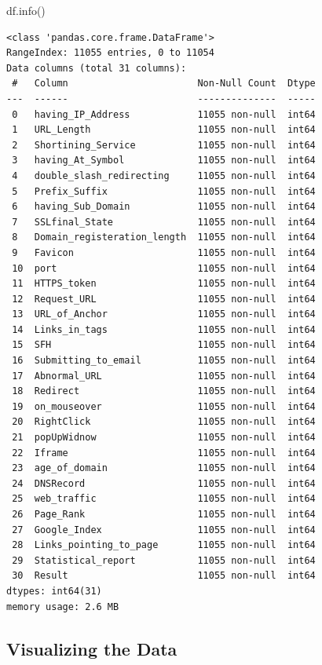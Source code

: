 \documentclass[
  letterpaper,
  DIV=11,
  numbers=noendperiod]{scrartcl}
\newenvironment{Shaded}{\begin{snugshade}}{\end{snugshade}}
\newcommand{\NormalTok}[1]{\textcolor[rgb]{0.00,0.23,0.31}{#1}}
\begin{document}
\begin{Shaded}
\begin{Highlighting}[]
\NormalTok{df.info()}
\end{Highlighting}
\end{Shaded}

\begin{verbatim}
<class 'pandas.core.frame.DataFrame'>
RangeIndex: 11055 entries, 0 to 11054
Data columns (total 31 columns):
 #   Column                       Non-Null Count  Dtype
---  ------                       --------------  -----
 0   having_IP_Address            11055 non-null  int64
 1   URL_Length                   11055 non-null  int64
 2   Shortining_Service           11055 non-null  int64
 3   having_At_Symbol             11055 non-null  int64
 4   double_slash_redirecting     11055 non-null  int64
 5   Prefix_Suffix                11055 non-null  int64
 6   having_Sub_Domain            11055 non-null  int64
 7   SSLfinal_State               11055 non-null  int64
 8   Domain_registeration_length  11055 non-null  int64
 9   Favicon                      11055 non-null  int64
 10  port                         11055 non-null  int64
 11  HTTPS_token                  11055 non-null  int64
 12  Request_URL                  11055 non-null  int64
 13  URL_of_Anchor                11055 non-null  int64
 14  Links_in_tags                11055 non-null  int64
 15  SFH                          11055 non-null  int64
 16  Submitting_to_email          11055 non-null  int64
 17  Abnormal_URL                 11055 non-null  int64
 18  Redirect                     11055 non-null  int64
 19  on_mouseover                 11055 non-null  int64
 20  RightClick                   11055 non-null  int64
 21  popUpWidnow                  11055 non-null  int64
 22  Iframe                       11055 non-null  int64
 23  age_of_domain                11055 non-null  int64
 24  DNSRecord                    11055 non-null  int64
 25  web_traffic                  11055 non-null  int64
 26  Page_Rank                    11055 non-null  int64
 27  Google_Index                 11055 non-null  int64
 28  Links_pointing_to_page       11055 non-null  int64
 29  Statistical_report           11055 non-null  int64
 30  Result                       11055 non-null  int64
dtypes: int64(31)
memory usage: 2.6 MB
\end{verbatim}

\hypertarget{visualizing-the-data}{%
\subsection{Visualizing the Data}\label{visualizing-the-data}}
\end{document}

